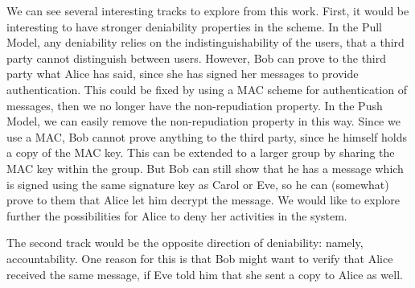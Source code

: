 We can see several interesting tracks to explore from this work.
First, it would be interesting to have stronger deniability properties in the 
scheme.
In the Pull Model, any deniability relies on the indistinguishability of the 
users, that a third party cannot distinguish between users.
However, Bob can prove to the third party what Alice has said, since she has 
signed her messages to provide authentication.
This could be fixed by using a \ac{MAC} scheme for authentication of messages, 
then we no longer have the non-repudiation property.
In the Push Model, we can easily remove the non-repudiation property in this 
way.
Since we use a \ac{MAC}, Bob cannot prove anything to the third party, since he 
himself holds a copy of the \ac{MAC} key.
This can be extended to a larger group by sharing the \ac{MAC} key within the 
group.
But Bob can still show that he has a message which is signed using the same 
signature key as Carol or Eve, so he can (somewhat) prove to them that Alice 
let him decrypt the message.
We would like to explore further the possibilities for Alice to deny her 
activities in the system.

The second track would be the opposite direction of deniability: namely, 
accountability.
One reason for this is that Bob might want to verify that Alice received the 
same message, if Eve told him that she sent a copy to Alice as well.





\begin{frame}
\printbibliography{}
\end{frame}
